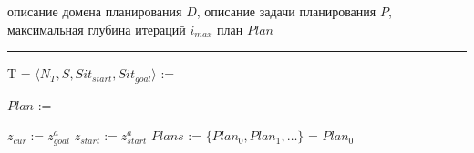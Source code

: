 \Require описание домена планирования $D$, описание задачи планирования $P$, максимальная глубина итераций $i_{max}$
\Ensure план $Plan$

\vspace*{1pt}
\hrule
\vspace*{5pt}

\State T = $\langle N_T,S,Sit_{start}, Sit_{goal}\rangle$ := \label{alst:ground}

\Statex{}
\State $Plan$ := 


	\State $z_{cur} := z_{goal}^a$
	\State $z_{start} := z_{start}^a$
	\State $Plans$ := \label{alst:start_iter}
	\State $\{Plan_0, Plan_1,\dots\}$ = \label{alst:sort}
	\State\Return $Plan_0$\label{alst:return}
\EndFunction

